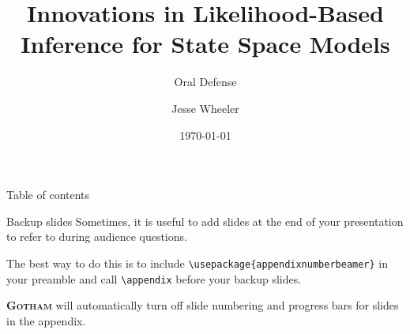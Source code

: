 \documentclass[aspectratio=169, 10pt]{beamer}\usepackage[]{graphicx}\usepackage[]{xcolor}
\title[]{Innovations in Likelihood-Based Inference for State Space Models}
\subtitle{Oral Defense}
\date[]{\today}
\author[Wheeler]{Jesse Wheeler}
\institute{Department of Statistics, University of Michigan}
\newcommand{\themename}{\textbf{\textsc{Gotham}}}
\begin{document}
\maketitle

	\begin{frame}[toc]{Table of contents}%
		\tableofcontents%
	\end{frame}

	
% 

% 




\appendix

	\begin{frame}[fragile]{Backup slides}
		Sometimes, it is useful to add slides at the end of your presentation to refer to during audience questions.

		The best way to do this is to include \verb|\usepackage{appendixnumberbeamer}| in your preamble and call \verb|\appendix| before your backup slides.

		\themename{} will automatically turn off slide numbering and progress bars for slides in the appendix.
	\end{frame}
\end{document}
